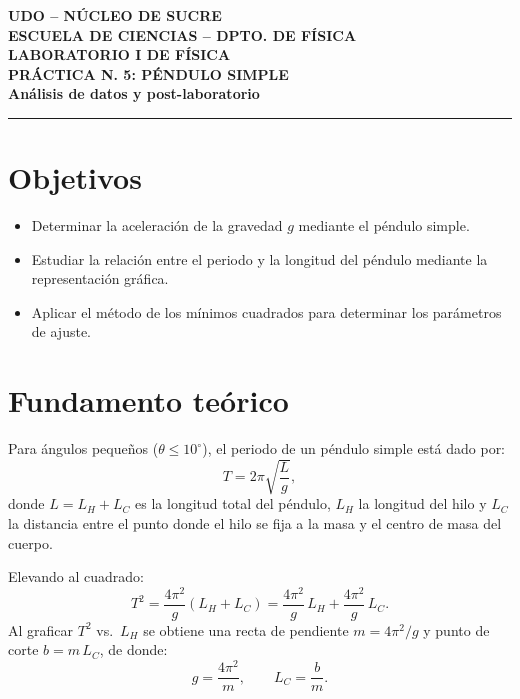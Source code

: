 \documentclass[12pt,a4paper]{article}
\begin{document}
\begin{center}
    \textbf{\Large UDO -- N\'UCLEO DE SUCRE}\\
    \vspace{0.2cm}
    \textbf{\large ESCUELA DE CIENCIAS -- DPTO. DE F\'ISICA}\\
    \vspace{0.2cm}
    \textbf{\large LABORATORIO I DE F\'ISICA}\\
    \vspace{0.4cm}
    \textbf{\Large PR\'ACTICA N. 5: P\'ENDULO SIMPLE}\\
    \vspace{0.2cm}
    \textbf{\large An\'alisis de datos y post-laboratorio}
\end{center}

\vspace{0.4cm}
\hrule
\vspace{0.4cm}

\section{Objetivos}
\begin{itemize}
    \item Determinar la aceleraci\'on de la gravedad $g$ mediante el p\'endulo simple.
    \item Estudiar la relaci\'on entre el periodo y la longitud del p\'endulo mediante la representaci\'on gr\'afica.
    \item Aplicar el m\'etodo de los m\'inimos cuadrados para determinar los par\'ametros de ajuste.
\end{itemize}

\section{Fundamento te\'orico}
Para \'angulos peque\~nos ($\theta \leq 10^\circ$), el periodo de un p\'endulo simple est\'a dado por:
\begin{equation}
    T = 2\pi\sqrt{\frac{L}{g}},
\end{equation}
donde $L = L_H + L_C$ es la longitud total del p\'endulo, $L_H$ la longitud del hilo y $L_C$ la distancia entre el punto donde el hilo se fija a la masa y el centro de masa del cuerpo.

Elevando al cuadrado:
\begin{equation}
    T^2 = \frac{4\pi^2}{g}(L_H + L_C)
        = \frac{4\pi^2}{g}\, L_H + \frac{4\pi^2}{g}\, L_C.
\end{equation}
Al graficar $T^2$ vs.\ $L_H$ se obtiene una recta de pendiente $m = 4\pi^2/g$ y punto de corte $b = m\,L_C$, de donde:
\begin{equation}
    g = \frac{4\pi^2}{m}, \qquad L_C = \frac{b}{m}.
\end{equation}
\end{document}
